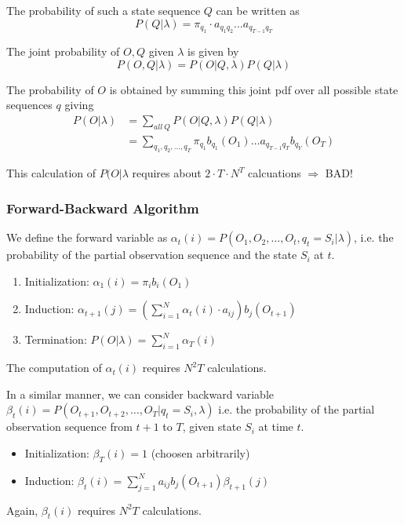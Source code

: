 \documentclass{scrartcl}
\begin{document}
\begin{appendices}
The probability of such a state sequence \(Q\) can be written as
\[P(Q|\lambda) = \pi_{q_1} \cdot a_{q_1q_2} \dots a_{q_{T-1} q_T}\]

The joint probability of \(O, Q\) given \(\lambda\) is given by
\[P(O, Q | \lambda) = P(O|Q, \lambda) P(Q| \lambda)\]

The probability of \(O\) is obtained by summing this joint pdf over all possible state sequences \(q\) giving
\begin{align*}
    P(O | \lambda) &= \sum_{all \ Q} P(O|Q, \lambda) P(Q|\lambda)\\
    &= \sum_{q_1, q_2, \dots, q_T} \pi_{q_1} b_{q_1}(O_1) \dots a_{q_{T-1}q_T} b_{q_Y}(O_T)
\end{align*}

This calculation of \(P(O|\lambda\) requires about \(2 \cdot T \cdot N^T\) calcuations \(\Rightarrow\) BAD!

\subsubsection{Forward-Backward Algorithm}
We define the forward variable as \(\alpha_t(i) = P(O_1, O_2, \dots, O_t, q_t= S_i|\lambda)\), i.e. the probability of the partial observation sequence and the state \(S_i\) at \(t\).

\begin{enumerate}
    \item
        Initialization: 
        \(\alpha_1(i) = \pi_i b_i(O_1)\)
    \item
        Induction:
        \(\alpha_{t+1}(j) = (\sum_{i=1}^N \alpha_t(i) \cdot a_{ij}) b_j(O_{t+1})\)
    \item
        Termination:
        \(P(O|\lambda) = \sum_{i=1}^N \alpha_T(i)\)
\end{enumerate}
The computation of \(\alpha_t(i)\) requires \(N^2 T\) calculations.

\bigbreak

In a similar manner, we can consider backward variable \(\beta_t(i) = P(O_{t+1}, O_{t+2}, \dots, O_T | q_t = S_i, \lambda)\)
i.e. the probability of the partial observation sequence from \(t+1\) to \(T\), given state \(S_i\) at time \(t\).
\begin{itemize}
    \item
        Initialization: \(\beta_T (i) = 1\) (choosen arbitrarily)
    \item
        Induction: \(\beta_t(i) = \sum_{j=1}^N a_{ij} b_j(O_{t+1}) \beta_{t+1}(j)\)
\end{itemize}
Again, \(\beta_t(i)\) requires \(N^2 T\) calculations.



\end{appendices}
\end{document}
